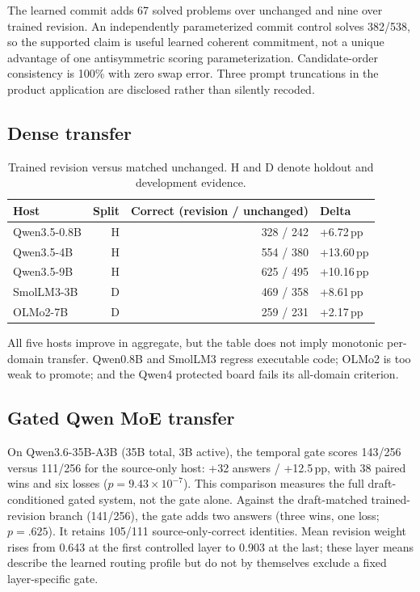 \documentclass[10pt]{article}
\newcommand{\pp}{\,pp}
\begin{document}
The learned commit adds 67 solved problems over unchanged and nine over trained
revision. An independently parameterized commit control solves 382/538, so the
supported claim is useful learned coherent commitment, not a unique advantage
of one antisymmetric scoring parameterization. Candidate-order consistency is
100\% with zero swap error. Three prompt truncations in the product application
are disclosed rather than silently recoded.

\subsection{Dense transfer}

\begin{table}[h]
\centering
\small
\caption{Trained revision versus matched unchanged. H and D denote holdout and
development evidence.}
\begin{tabular}{lrrl}
\toprule
Host & Split & Correct (revision / unchanged) & Delta\\
\midrule
Qwen3.5-0.8B & H & 328 / 242 & +6.72\pp\\
Qwen3.5-4B & H & 554 / 380 & +13.60\pp\\
Qwen3.5-9B & H & 625 / 495 & +10.16\pp\\
SmolLM3-3B & D & 469 / 358 & +8.61\pp\\
OLMo2-7B & D & 259 / 231 & +2.17\pp\\
\bottomrule
\end{tabular}
\label{tab:dense}
\end{table}

All five hosts improve in aggregate, but the table does not imply monotonic
per-domain transfer. Qwen0.8B and SmolLM3 regress executable code; OLMo2 is too
weak to promote; and the Qwen4 protected board fails its all-domain criterion.

\subsection{Gated Qwen MoE transfer}

On Qwen3.6-35B-A3B (35B total, 3B active), the temporal gate scores 143/256
versus 111/256 for the source-only host: +32 answers / +12.5\pp, with 38 paired
wins and six losses ($p=9.43\times10^{-7}$). This comparison measures the full
draft-conditioned gated system, not the gate alone. Against the draft-matched
trained-revision branch (141/256), the gate adds two answers (three wins, one
loss; $p=.625$). It retains 105/111 source-only-correct identities. Mean
revision weight rises from 0.643 at the first controlled layer to 0.903 at the
last; these layer means describe the learned routing profile but do not by
themselves exclude a fixed layer-specific gate.
\end{document}
